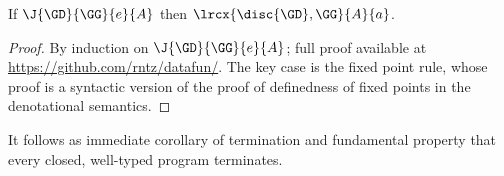 \begin{theorem}
  If $\J{\GD}{\GG}{e}{A}$ then $\lrcx{\disc{\GD},\GG}{A}{a}$.
\end{theorem}
\begin{proof}
  By induction on $\J{\GD}{\GG}{e}{A}$; full proof available at
  \url{https://github.com/rntz/datafun/}. The key case is the fixed point rule,
  whose proof is a syntactic version of the proof of definedness of fixed points
  in the denotational semantics.
\end{proof}

It follows as immediate corollary of termination and fundamental property that
every closed, well-typed program terminates. 
